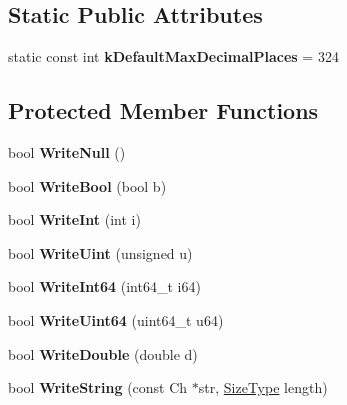 \subsection*{Static Public Attributes}
\begin{DoxyCompactItemize}
\item 
static const int {\bfseries k\+Default\+Max\+Decimal\+Places} = 324\hypertarget{classWriter_ab46d66ae0ca78cb03ab7fb865d129934}{}\label{classWriter_ab46d66ae0ca78cb03ab7fb865d129934}

\end{DoxyCompactItemize}
\subsection*{Protected Member Functions}
\begin{DoxyCompactItemize}
\item 
bool {\bfseries Write\+Null} ()\hypertarget{classWriter_a44862b3eba8d84b909c69aba875c9f4d}{}\label{classWriter_a44862b3eba8d84b909c69aba875c9f4d}

\item 
bool {\bfseries Write\+Bool} (bool b)\hypertarget{classWriter_a42ad68b6950431bb8ca0199568546eaf}{}\label{classWriter_a42ad68b6950431bb8ca0199568546eaf}

\item 
bool {\bfseries Write\+Int} (int i)\hypertarget{classWriter_a31d0feda654ca245c41462be7dc59998}{}\label{classWriter_a31d0feda654ca245c41462be7dc59998}

\item 
bool {\bfseries Write\+Uint} (unsigned u)\hypertarget{classWriter_a2861227e93707d1478d2cf56644dca3b}{}\label{classWriter_a2861227e93707d1478d2cf56644dca3b}

\item 
bool {\bfseries Write\+Int64} (int64\+\_\+t i64)\hypertarget{classWriter_aa58d3f80c06394648de5055ecfb41587}{}\label{classWriter_aa58d3f80c06394648de5055ecfb41587}

\item 
bool {\bfseries Write\+Uint64} (uint64\+\_\+t u64)\hypertarget{classWriter_ad07b325157220e3aa791c1c8c904021e}{}\label{classWriter_ad07b325157220e3aa791c1c8c904021e}

\item 
bool {\bfseries Write\+Double} (double d)\hypertarget{classWriter_ae7a0fc4740681d845d92c1213bd25aa1}{}\label{classWriter_ae7a0fc4740681d845d92c1213bd25aa1}

\item 
bool {\bfseries Write\+String} (const Ch $\ast$str, \hyperlink{rapidjson_8h_a5ed6e6e67250fadbd041127e6386dcb5}{Size\+Type} length)\hypertarget{classWriter_acda4412ef5f4cac6e89f9544e4b10f70}{}\label{classWriter_acda4412ef5f4cac6e89f9544e4b10f70}


\end{DoxyCompactItemize}
